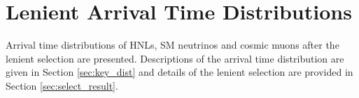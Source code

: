 
\chapter{Lenient Arrival Time Distributions} 
\label{appendix_lenient}
\ifpdf
    \graphicspath{{Appendix4/Figs/Raster/}{Appendix4/Figs/PDF/}{Appendix4/Figs/}}
\else
    \graphicspath{{Appendix4/Figs/Vector/}{Appendix4/Figs/}}
\fi

Arrival time distributions of HNLs, SM neutrinos and cosmic muons after the lenient selection are presented.
Descriptions of the arrival time distribution are given in Section \ref{sec:key_dist} and details of the lenient selection are provided in Section \ref{sec:select_result}.

